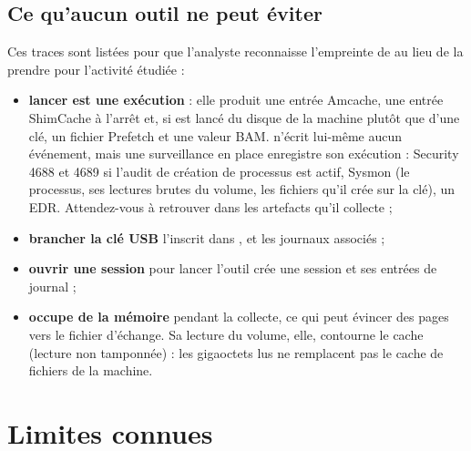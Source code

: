 \documentclass[11pt,a4paper,oneside]{report}
\begin{document}
\section{Ce qu'aucun outil ne peut éviter}

Ces traces sont listées pour que l'analyste reconnaisse l'empreinte de \wac{} au
lieu de la prendre pour l'activité étudiée :

\begin{itemize}
  \item \textbf{lancer  est une exécution} : elle produit une
        entrée Amcache, une entrée ShimCache à l'arrêt et, si \wac{} est lancé
        du disque de la machine plutôt que d'une clé, un fichier Prefetch et une
        valeur BAM. \wac{} n'écrit lui-même aucun événement, mais une
        surveillance en place enregistre son exécution : Security 4688 et 4689
        si l'audit de création de processus est actif, Sysmon (le processus,
        ses lectures brutes du volume, les fichiers qu'il crée sur la clé), un
        EDR. Attendez-vous à retrouver \wac{} dans les artefacts qu'il
        collecte ;
  \item \textbf{brancher la clé USB} l'inscrit dans ,
         et les journaux associés ;
  \item \textbf{ouvrir une session} pour lancer l'outil crée une session et ses
        entrées de journal ;
  \item \wac{} \textbf{occupe de la mémoire} pendant la collecte, ce qui peut
        évincer des pages vers le fichier d'échange. Sa lecture du volume, elle,
        contourne le cache (lecture non tamponnée) : les gigaoctets lus ne
        remplacent pas le cache de fichiers de la machine.
\end{itemize}

\chapter{Limites connues}
\end{document}
